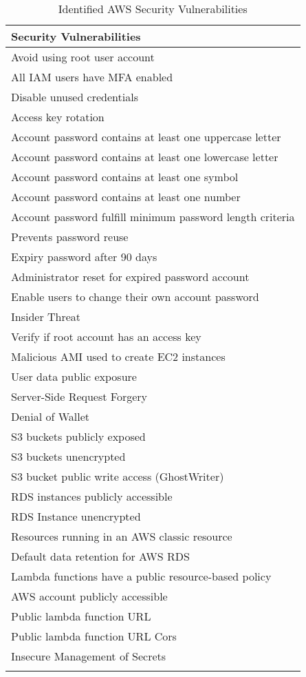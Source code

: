 \begin{longtable}{|p{10cm}|}
    \hline
    \textbf{Security Vulnerabilities}\\
    \hline
    Avoid using root user account \\
    \hline
    All IAM users have MFA enabled \\
    \hline
    Disable unused credentials \\
    \hline
    Access key rotation \\
    \hline
    Account password contains at least one uppercase letter \\
    \hline
    Account password contains at least one lowercase letter \\
    \hline
    Account password contains at least one symbol \\
    \hline
    Account password contains at least one number \\
    \hline
    Account password fulfill minimum password length criteria\\
    \hline
    Prevents password reuse \\
    \hline
    Expiry password after 90 days \\
    \hline
    Administrator reset for expired password account\\
    \hline
    Enable users to change their own account password \\
    \hline
    Insider Threat \\
    \hline
    Verify if root account has an access key \\
    \hline
    Malicious AMI used to create EC2 instances\\
    \hline
    User data public exposure \\
    \hline
    Server-Side Request Forgery \\
    \hline
    Denial of Wallet \\
    \hline
    S3 buckets publicly exposed\\
    \hline
    S3 buckets unencrypted \\
    \hline
    S3 bucket public write access (GhostWriter) \\
    \hline
    RDS instances publicly accessible \\
    \hline
    RDS Instance unencrypted \\
    \hline
    Resources running in an AWS classic resource \\
    \hline
    Default data retention for AWS RDS \\
    \hline
    Lambda functions have a public resource-based policy \\
    \hline
    AWS account publicly accessible  \\
    \hline
    Public lambda function URL \\
    \hline
    Public lambda function URL Cors \\
    \hline
    Insecure Management of Secrets \\
    \hline
    \caption{Identified AWS Security Vulnerabilities}
    \label{tab:identifiedsecurityvulnerabilities}
\end{longtable}









